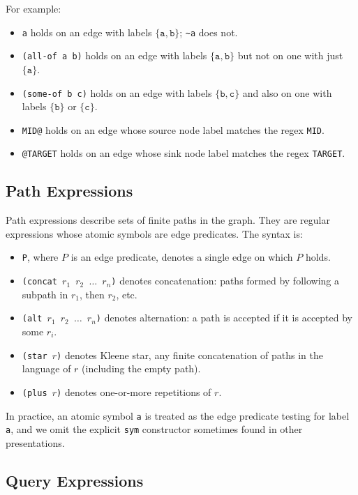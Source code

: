 \documentclass[11pt]{article}
\begin{document}
For example:
\begin{itemize}[leftmargin=*]
  \item \texttt{a} holds on an edge with labels $\{\texttt{a},\texttt{b}\}$; \texttt{\textasciitilde a} does not.
  \item \texttt{(all-of a b)} holds on an edge with labels $\{\texttt{a},\texttt{b}\}$ but not on one with just $\{\texttt{a}\}$.
  \item \texttt{(some-of b c)} holds on an edge with labels $\{\texttt{b},\texttt{c}\}$ and also on one with labels $\{\texttt{b}\}$ or $\{\texttt{c}\}$.
  \item \texttt{MID@} holds on an edge whose source node label matches the regex \texttt{MID}.
  \item \texttt{@TARGET} holds on an edge whose sink node label matches the regex \texttt{TARGET}.
\end{itemize}

\subsection{Path Expressions}

Path expressions describe sets of finite paths in the graph. They are regular expressions whose atomic symbols are edge predicates. The syntax is:
\begin{itemize}[leftmargin=*]
  \item \texttt{P}, where $P$ is an edge predicate, denotes a single edge on which $P$ holds.
  \item \texttt{(concat $r_1$ $r_2$ $\dots$ $r_n$)} denotes concatenation: paths formed by following a subpath in $r_1$, then $r_2$, etc.
  \item \texttt{(alt $r_1$ $r_2$ $\dots$ $r_n$)} denotes alternation: a path is accepted if it is accepted by some $r_i$.
  \item \texttt{(star $r$)} denotes Kleene star, any finite concatenation of paths in the language of $r$ (including the empty path).
  \item \texttt{(plus $r$)} denotes one-or-more repetitions of $r$.
\end{itemize}

In practice, an atomic symbol \texttt{a} is treated as the edge predicate testing for label \texttt{a}, and we omit the explicit \texttt{sym} constructor sometimes found in other presentations.

\subsection{Query Expressions}
\end{document}
